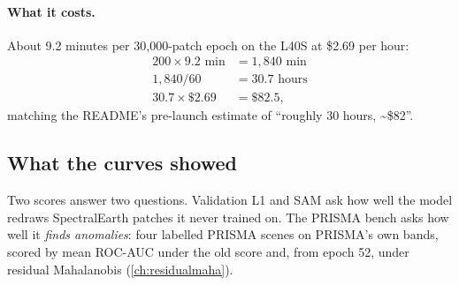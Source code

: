 \paragraph{What it costs.} About 9.2 minutes per 30,000-patch epoch on the L40S at \$2.69 per hour:
\begin{align*}
  200 \times 9.2 \text{ min} &= 1{,}840 \text{ min}\\
  1{,}840 / 60 &= 30.7 \text{ hours}\\
  30.7 \times \$2.69 &= \$82.5,
\end{align*}
matching the README's pre-launch estimate of ``roughly 30 hours, \textasciitilde\$82''.\tbrk{}

\subsection{What the curves showed}

Two scores answer two questions. Validation L1 and SAM ask how well the model redraws SpectralEarth patches it never trained
on. The PRISMA bench asks how well it \emph{finds anomalies}: four labelled PRISMA scenes on PRISMA's own bands, scored by
mean ROC-AUC under the old  score and, from epoch 52, under residual Mahalanobis (\cref{ch:residualmaha}).


